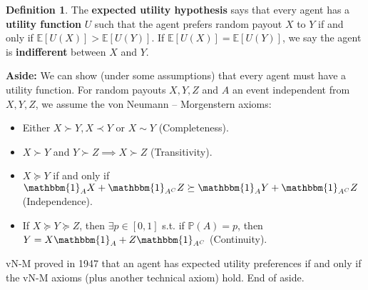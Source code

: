 \documentclass{article}
\theoremstyle{definition}
\newtheorem{defn}{Definition}[section]
\begin{document}
\begin{defn}
    The \textbf{expected utility hypothesis} says that every agent has a \textbf{utility function} $U$ such that the agent prefers random payout $X$ to $Y$ if and only if $\mathbb{E}[U(X)] > \mathbb{E}[U(Y)]$. If $\mathbb{E}[U(X)] = \mathbb{E}[U(Y)]$, we say the agent is \textbf{indifferent} between $X$ and $Y$.
\end{defn}

\textbf{Aside:} We can show (under some assumptions) that every agent must have a utility function. For random payouts $X,Y,Z$ and $A$ an event independent from $X,Y,Z$, we assume the von Neumann -- Morgenstern axioms:
\begin{itemize}
    \item Either $X \succ Y, X \prec Y$ or $X \sim Y$ (Completeness).
    \item $X \succ Y$ and $Y \succ Z \implies X \succ Z$ (Transitivity).
    \item $X \succeq Y$ if and only if $\mathbbm{1}_A X  + \mathbbm{1}_{A^C} Z \succeq \mathbbm{1}_A Y + \mathbbm{1}_{A^C} Z$ (Independence).
    \item If $X \succeq Y \succeq Z$, then $\exists p \in [0,1]$ s.t. if $\mathbb{P}(A)=p$, then $Y = X \mathbbm{1}_A + Z \mathbbm{1}_{A^C}$ (Continuity).
\end{itemize}
vN-M proved in 1947 that an agent has expected utility preferences if and only if the vN-M axioms (plus another technical axiom) hold. End of aside.
\end{document}
